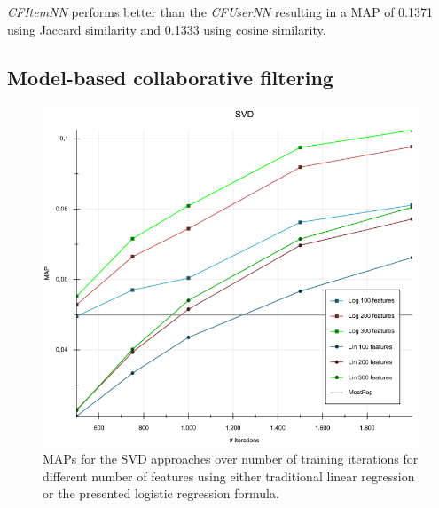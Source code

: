 \documentclass[10pt]{reportMaster}
\begin{document}
\textit{CFItemNN} performs better than the \textit{CFUserNN} resulting in a MAP of 0.1371 using Jaccard similarity and 0.1333 using cosine similarity.

\subsection*{Model-based collaborative filtering}

\begin{figure}[h!]
	\centering
	\includegraphics[width=1\textwidth]{figures/experiments/SVDIterations}
	\caption[MAPs for SVD approaches over different number of iterations]{MAPs for the SVD approaches over number of training iterations for different number of features using either traditional linear regression or the presented logistic regression formula.}
	\label{fig:SVDIterations}
\end{figure}
\end{document}
